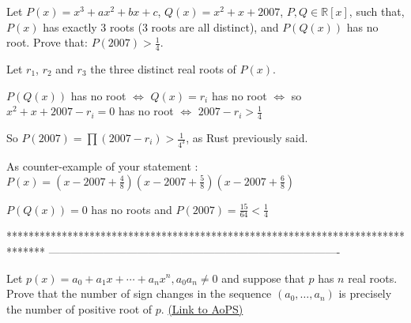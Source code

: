 \begin{solution}
	\begin{tcolorbox}Let $ P(x) = x^3 + ax^2 + bx + c$, $ Q(x) = x^2 + x + 2007$, $ P,Q\in \mathbb {R}[x]$, such that, $ P(x)$ has exactly $ 3$ roots ($ 3$ roots are all distinct), and $ P(Q(x))$ has no root. Prove that: $ P(2007) > \frac {1}{4}$.\end{tcolorbox}

Let $ r_1$, $ r_2$ and $ r_3$ the three distinct real roots of $ P(x)$.

$ P(Q(x))$ has no root $ \iff$  $ Q(x)=r_i$ has no root $ \iff$  so $ x^2 + x + 2007 - r_i = 0$ has no root $ \iff$ $ 2007-r_i>\frac{1}{4}$

So $ P(2007)=\prod (2007 - r_i) > \frac{1}{4^3}$, as Rust previously said.

As counter-example of your statement :
$ P(x)= (x - 2007 + \frac{4}{8}) (x - 2007 + \frac{5}{8})(x - 2007 + \frac{6}{8})$

$ P(Q(x))=0$ has no roots and $ P(2007)=\frac{15}{64} < \frac{1}{4}$
\end{solution}
*******************************************************************************
-------------------------------------------------------------------------------

\begin{problem}
	Let $ p(x) = a_0 + a_1x + \cdots + a_nx^n,a_0a_n \neq 0$ and suppose that $p$ has $n$ real roots. Prove that the number of sign changes in the sequence $ (a_0,\ldots,a_n)$ is precisely the number of positive root of $p$.
	\flushright \href{https://artofproblemsolving.com/community/c6h275206}{(Link to AoPS)}
\end{problem}



